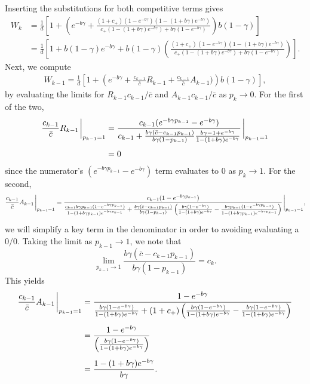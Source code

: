 \documentclass[9pt,twocolumn,twoside,lineno]{gsajnl}
\begin{document}
Inserting the substitutions for both competitive terms gives
\begin{align}
W_k  &= \frac{1}{d}\left[1+\left(e^{-b\gamma} + \frac{(1+c_+)(1-e^{-b\gamma})(1-(1+b\gamma)e^{-b\gamma})}{c_+(1-(1+b\gamma)e^{-b\gamma}) + b\gamma(1-e^{-b\gamma})}\right)b(1-\gamma)\right] \nonumber\\[4pt]
&= \frac{1}{d}\left[1+b(1-\gamma)e^{-b\gamma} + b(1-\gamma)\left(\frac{(1+c_+)(1-e^{-b\gamma})(1-(1+b\gamma)e^{-b\gamma})}{c_+(1-(1+b\gamma)e^{-b\gamma}) + b\gamma(1-e^{-b\gamma})}\right)\right]. \label{app:eq:AbsFitMutant}
\end{align}
Next, we compute
\[
\begin{aligned}
W_{k-1} = \frac{1}{d}\left[1+\left(e^{-b\gamma} +\frac{c_{k-1}}{\bar{c}}R_{k-1}+ \frac{c_{k-1}}{\bar{c}}A_{k-1})\right)b(1-\gamma)\right],
\end{aligned}
\]
by evaluating the limits for $R_{k-1} c_{k-1}/\bar{c}$ and $A_{k-1} c_{k-1}/\bar{c}$ as $p_{k}\rightarrow 0$. For the first of the two,
\[
\begin{aligned}
\frac{c_{k-1}}{\bar{c}} R_{k-1}\eval_{p_{k-1}=1} &= 
\frac{c_{k-1}(e^{-b\gamma p_{k-1}}-e^{-b\gamma})}{c_{k-1} +\frac{b\gamma (\bar{c}-c_{k-1}p_{k-1})}{b\gamma (1-p_{k-1})}\frac{b\gamma-1+e^{-b\gamma}}{1-(1+b\gamma)e^{-b\gamma}}}\eval_{p_{k-1}=1} \\[4pt]
&= 0
\end{aligned}
\]
since the numerator's $(e^{-b\gamma p_{k-1}}-e^{-b\gamma})$ term evaluates to $0$ as $p_k\rightarrow 1$.
For the second,
\[
\begin{aligned}
\frac{c_{k-1}}{\bar{c}}A_{k-1}\eval_{p_{k-1}=1} &=  \frac{c_{k-1}(1-e^{-b\gamma p_{k-1}})}{ \frac{c_{k-1}b\gamma p_{k-1}(1-e^{-b\gamma p_{k-1}})}{1-(1+b\gamma p_{k-1})e^{-b\gamma p_{k-1}}}+\frac{b\gamma(\bar{c}-c_{k-1}p_{k-1})}{b\gamma(1-p_{k-1})}\left(\frac{b\gamma(1-e^{-b\gamma})}{1-(1+b\gamma)e^{-b\gamma}}-\frac{b\gamma p_{k-1}(1-e^{-b\gamma p_{k-1}})}{1-(1+b\gamma p_{k-1})e^{-b\gamma p_{k-1}}}\right)}\eval_{p_{k-1}=1},\\[4pt]
\end{aligned}
\]
we will simplify a key term in the denominator in order to avoiding evaluating a $0/0$.
Taking the limit as $p_{k-1}\rightarrow 1$, we note that
\[
\lim_{p_{k-1}\rightarrow 1} \frac{b\gamma(\bar{c}-c_{k-1}p_{k-1})}{b\gamma(1-p_{k-1})} = c_{k}.
\]
This yields
\[
\begin{aligned}
\frac{c_{k-1}}{\bar{c}}A_{k-1}\eval_{p_{k-1}=1} &=  \frac{1-e^{-b\gamma}}{ \frac{b\gamma (1-e^{-b\gamma })}{1-(1+b\gamma )e^{-b\gamma }}+ (1+c_+)\left(\frac{b\gamma(1-e^{-b\gamma})}{1-(1+b\gamma)e^{-b\gamma}}-\frac{b\gamma (1-e^{-b\gamma})}{1-(1+b\gamma )e^{-b\gamma }}\right)}\\[4pt]
&=  \frac{1-e^{-b\gamma}}{ \left(\frac{b\gamma (1-e^{-b\gamma })}{1-(1+b\gamma )e^{-b\gamma }} \right)}\\[4pt]
&=  \frac{1-(1+b\gamma)e^{-b\gamma }}{ b\gamma}.\\
\end{aligned}
\]
\end{document}
